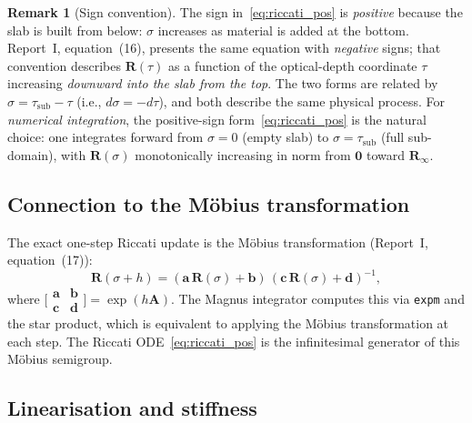 \documentclass[11pt,a4paper]{article}
\newcommand{\mat}[1]{\mathbf{#1}}
\newcommand{\tsub}{\tau_{\mathrm{sub}}}
\newcommand{\Rinf}{\mat{R}_\infty}
\theoremstyle{definition}
\newtheorem{remark}{Remark}
\begin{document}
\begin{remark}[Sign convention]\label{rem:sign_convention}
The sign in~\eqref{eq:riccati_pos} is \emph{positive} because the slab
is built from below: $\sigma$ increases as material is added at the
bottom.  Report~I, equation~(16), presents the same equation with
\emph{negative} signs; that convention describes $\mat{R}(\tau)$ as a
function of the optical-depth coordinate $\tau$ increasing
\emph{downward into the slab from the top}.  The two forms are related
by $\sigma=\tsub-\tau$ (i.e., $d\sigma = -d\tau$), and both describe
the same physical process.  For \emph{numerical integration}, the
positive-sign form~\eqref{eq:riccati_pos} is the natural choice: one
integrates forward from $\sigma=0$ (empty slab) to $\sigma=\tsub$
(full sub-domain), with $\mat{R}(\sigma)$ monotonically increasing in
norm from $\mat{0}$ toward $\Rinf$.
\end{remark}

\subsection{Connection to the M\"obius transformation}

The exact one-step Riccati update is the M\"obius transformation
(Report~I, equation~(17)):
\begin{equation}
  \mat{R}(\sigma+h)
  = (\mat{a}\,\mat{R}(\sigma)+\mat{b})\,
    (\mat{c}\,\mat{R}(\sigma)+\mat{d})^{-1},
\end{equation}
where $\bigl[\begin{smallmatrix}\mat{a}&\mat{b}\\
\mat{c}&\mat{d}\end{smallmatrix}\bigr]=\exp(h\mat{A})$.
The Magnus integrator computes this via \texttt{expm} and the
star product, which is equivalent to applying the M\"obius
transformation at each step.  The Riccati ODE~\eqref{eq:riccati_pos}
is the infinitesimal generator of this M\"obius semigroup.

\subsection{Linearisation and stiffness}\label{sec:linearisation}
\end{document}
